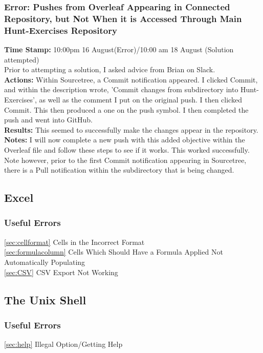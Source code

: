 \documentclass{article}
\begin{document}
\begin{FlushLeft}
\subsubsection{Error: Pushes from Overleaf Appearing in Connected Repository, but Not When it is Accessed Through Main Hunt-Exercises Repository}
\textbf{Time Stamp:} 10:00pm 16 August(Error)/10:00 am 18 August (Solution attempted)\\
Prior to attempting a solution, I asked advice from Brian on Slack.\\
\textbf{Actions:} Within Sourcetree, a Commit notification appeared. I clicked Commit, and within the description wrote, 'Commit changes from subdirectory into Hunt-Exercises', as well as the comment I put on the original push. I then clicked Commit. This then produced a one on the push symbol. I then completed the push and went into GitHub.\\
\textbf{Results:} This seemed to successfully make the changes appear in the repository.\\
\textbf{Notes:} I will now complete a new push with this added objective within the Overleaf file and follow these steps to see if it works. This worked successfully. Note however, prior to the first Commit notification appearing in Sourcetree, there is a Pull notification within the subdirectory that is being changed.

\subsection{Excel}
\subsubsection{Useful Errors}
\autoref{sec:cellformat} Cells in the Incorrect Format\\
\autoref{sec:formulacolumn} Cells Which Should Have a Formula Applied Not Automatically Populating\\
\autoref{sec:CSV} CSV Export Not Working\\

\subsection{The Unix Shell}
\subsubsection{Useful Errors}
\autoref{sec:help} Illegal Option/Getting Help\\


\end{FlushLeft}
\end{document}
